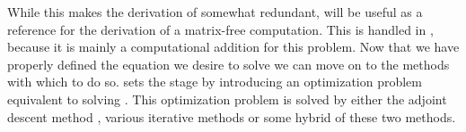 While this makes the derivation of  somewhat redundant,
 will be useful as a reference for the derivation
of a matrix-free computation. This is handled in ,
because it is mainly a computational addition for this problem.
Now that we have properly defined the equation we desire to solve we
can move on to the methods with which to do so. 
sets the stage by introducing an optimization problem equivalent
to solving . This optimization problem is solved
by either the adjoint descent method ,
various iterative methods   or some
hybrid of these two methods.
